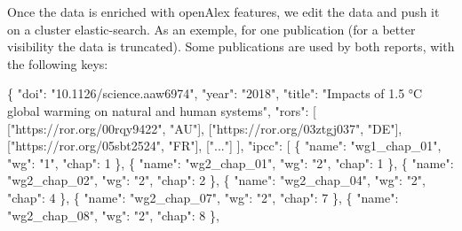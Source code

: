 \documentclass[
]{article}
\newenvironment{Shaded}{}{}
\newcommand{\DataTypeTok}[1]{\textcolor[rgb]{0.56,0.13,0.00}{#1}}
\newcommand{\DecValTok}[1]{\textcolor[rgb]{0.25,0.63,0.44}{#1}}
\newcommand{\FunctionTok}[1]{\textcolor[rgb]{0.02,0.16,0.49}{#1}}
\newcommand{\OtherTok}[1]{\textcolor[rgb]{0.00,0.44,0.13}{#1}}
\newcommand{\StringTok}[1]{\textcolor[rgb]{0.25,0.44,0.63}{#1}}
\begin{document}
Once the data is enriched with openAlex features, we edit the data and
push it on a cluster elastic-search. As an exemple, for one publication
(for a better visibility the data is truncated). Some publications are
used by both reports, with the following keys:

\begin{Shaded}
\begin{Highlighting}[]
\FunctionTok{\{}
  \DataTypeTok{"doi"}\FunctionTok{:} \StringTok{"10.1126/science.aaw6974"}\FunctionTok{,}
  \DataTypeTok{"year"}\FunctionTok{:} \StringTok{"2018"}\FunctionTok{,}
  \DataTypeTok{"title"}\FunctionTok{:} \StringTok{"Impacts of 1.5 °C global warming on natural and human systems"}\FunctionTok{,}
  \DataTypeTok{"rors"}\FunctionTok{:} \OtherTok{[}
    \OtherTok{[}\StringTok{"https://ror.org/00rqy9422"}\OtherTok{,} \StringTok{"AU"}\OtherTok{],}
    \OtherTok{[}\StringTok{"https://ror.org/03ztgj037"}\OtherTok{,} \StringTok{"DE"}\OtherTok{],}
    \OtherTok{[}\StringTok{"https://ror.org/05sbt2524"}\OtherTok{,} \StringTok{"FR"}\OtherTok{],}
    \OtherTok{[}\StringTok{"..."}\OtherTok{]}
  \OtherTok{]}\FunctionTok{,}
  \DataTypeTok{"ipcc"}\FunctionTok{:} \OtherTok{[}
    \FunctionTok{\{} \DataTypeTok{"name"}\FunctionTok{:} \StringTok{"wg1\_chap\_01"}\FunctionTok{,} \DataTypeTok{"wg"}\FunctionTok{:} \StringTok{"1"}\FunctionTok{,} \DataTypeTok{"chap"}\FunctionTok{:} \DecValTok{1} \FunctionTok{\}}\OtherTok{,}
    \FunctionTok{\{} \DataTypeTok{"name"}\FunctionTok{:} \StringTok{"wg2\_chap\_01"}\FunctionTok{,} \DataTypeTok{"wg"}\FunctionTok{:} \StringTok{"2"}\FunctionTok{,} \DataTypeTok{"chap"}\FunctionTok{:} \DecValTok{1} \FunctionTok{\}}\OtherTok{,}
    \FunctionTok{\{} \DataTypeTok{"name"}\FunctionTok{:} \StringTok{"wg2\_chap\_02"}\FunctionTok{,} \DataTypeTok{"wg"}\FunctionTok{:} \StringTok{"2"}\FunctionTok{,} \DataTypeTok{"chap"}\FunctionTok{:} \DecValTok{2} \FunctionTok{\}}\OtherTok{,}
    \FunctionTok{\{} \DataTypeTok{"name"}\FunctionTok{:} \StringTok{"wg2\_chap\_04"}\FunctionTok{,} \DataTypeTok{"wg"}\FunctionTok{:} \StringTok{"2"}\FunctionTok{,} \DataTypeTok{"chap"}\FunctionTok{:} \DecValTok{4} \FunctionTok{\}}\OtherTok{,}
    \FunctionTok{\{} \DataTypeTok{"name"}\FunctionTok{:} \StringTok{"wg2\_chap\_07"}\FunctionTok{,} \DataTypeTok{"wg"}\FunctionTok{:} \StringTok{"2"}\FunctionTok{,} \DataTypeTok{"chap"}\FunctionTok{:} \DecValTok{7} \FunctionTok{\}}\OtherTok{,}
    \FunctionTok{\{} \DataTypeTok{"name"}\FunctionTok{:} \StringTok{"wg2\_chap\_08"}\FunctionTok{,} \DataTypeTok{"wg"}\FunctionTok{:} \StringTok{"2"}\FunctionTok{,} \DataTypeTok{"chap"}\FunctionTok{:} \DecValTok{8} \FunctionTok{\}}\OtherTok{,}

\end{Highlighting}
\end{Shaded}
\end{document}
